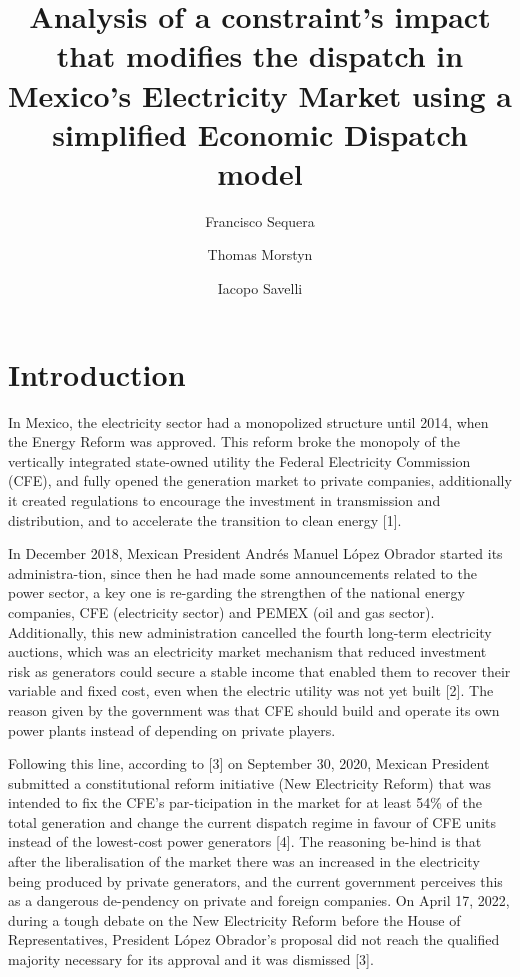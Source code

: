 \documentclass[eng]{ajceam-class}
\title{Analysis of a constraint’s impact that modifies the  dispatch in Mexico’s Electricity Market using a simplified Economic Dispatch model}
\author[1]{Francisco Sequera}
\author[2]{Thomas Morstyn}
\author[3]{Iacopo Savelli}
\affil[1]{University of Edinburgh, Edinburgh, UK}
\affil[2]{University of Edinburgh, Energy Systems, Edinburgh, UKy}
\affil[3]{University of Edinburgh,Energy Systems, Edinburgh, UK}
\begin{document}
\maketitle
\thispagestyle{fancy}
\printcontactdata

\section{Introduction}
In Mexico, the electricity sector had a monopolized structure until 2014, when the Energy Reform was approved. This reform broke the monopoly of the vertically integrated state-owned utility the Federal Electricity Commission (CFE), and fully opened the generation market to private companies, additionally it created regulations to encourage the investment in transmission and distribution, and to accelerate the transition to clean energy [1]. 

In December 2018, Mexican President Andrés Manuel López Obrador started its administra-tion, since then he had made some announcements related to the power sector, a key one is re-garding the strengthen of the national energy companies, CFE (electricity sector) and PEMEX (oil and gas sector). Additionally, this new administration cancelled the fourth long-term electricity auctions, which was an electricity market mechanism that reduced investment risk as generators could secure a stable income that enabled them to recover their variable and fixed cost, even when the electric utility was not yet built [2]. The reason given by the government was that CFE should build and operate its own power plants instead of depending on private players.

Following this line, according to [3] on September 30, 2020, Mexican President submitted a constitutional reform initiative (New Electricity Reform) that was intended to fix the CFE’s par-ticipation in the market for at least 54\% of the total generation and change the current dispatch regime in favour of CFE units instead of the lowest-cost power generators [4]. The reasoning be-hind is that after the liberalisation of the market there was an increased in the electricity being produced by private generators, and the current government perceives this as a dangerous de-pendency on private and foreign companies. On April 17, 2022, during a tough debate on the New Electricity Reform before the House of Representatives, President López Obrador’s proposal did not reach the qualified majority necessary for its approval and it was dismissed [3].  
\end{document}

